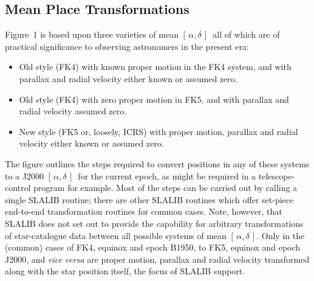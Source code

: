 \documentclass[11pt,twoside]{article}
\newcommand{\radec}     {$[\,\alpha,\delta\,]$}
\begin{document}
\subsection{Mean Place Transformations}
Figure~1 is based upon three varieties of mean \radec\ all of which are
of practical significance to observing astronomers in the present era:
\begin{itemize}
   \item Old style (FK4) with known proper motion in the FK4
         system, and with parallax and radial velocity either
         known or assumed zero.
   \item Old style (FK4) with zero proper motion in FK5,
         and with parallax and radial velocity assumed zero.
   \item New style (FK5 or, loosely, ICRS)
         with proper motion, parallax and
         radial velocity either known or assumed zero.
\end{itemize}
The figure outlines the steps required to convert positions in
any of these systems to a J2000 \radec\ for the current
epoch, as might be required in a telescope-control
program for example.
Most of the steps can be carried out by calling a single
SLALIB routine;  there are other SLALIB routines which
offer set-piece end-to-end transformation routines for common cases.
Note, however, that SLALIB does not set out to provide the capability
for arbitrary transformations of star-catalogue data
between all possible systems of mean \radec.
Only in the (common) cases of FK4, equinox and epoch B1950,
to FK5, equinox and epoch J2000, and {\it vice versa}\/ are
proper motion, parallax and radial velocity transformed
along with the star position itself, the
focus of SLALIB support.
\end{document}
